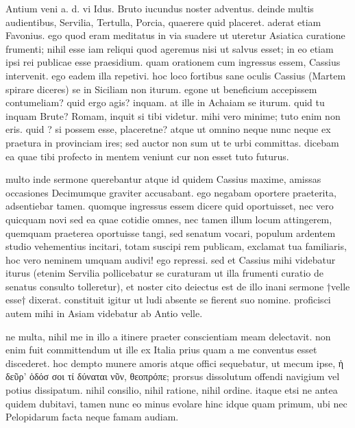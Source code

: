 


 Antium veni a. d. vi Idus. Bruto iucundus noster adventus. deinde multis audientibus, Servilia, Tertulla, Porcia, quaerere quid placeret. aderat etiam Favonius. ego quod eram meditatus in via suadere ut uteretur Asiatica curatione frumenti; nihil esse iam reliqui quod ageremus nisi ut salvus esset; in eo etiam ipsi rei publicae esse praesidium. quam orationem cum ingressus essem, Cassius intervenit. ego eadem illa repetivi. hoc loco fortibus sane oculis Cassius (Martem spirare diceres) se in Siciliam non iturum. egone ut beneficium accepissem contumeliam? quid ergo agis? inquam. at ille in Achaiam se iturum. quid tu inquam Brute? Romam, inquit si tibi videtur. mihi vero minime; tuto enim non eris. quid ? si possem esse, placeretne? atque ut omnino neque nunc neque ex praetura in provinciam ires; sed auctor non sum ut te urbi committas. dicebam ea quae tibi profecto in mentem veniunt cur non esset tuto futurus.

 multo inde sermone querebantur atque id quidem Cassius maxime, amissas occasiones Decimumque graviter accusabant. ego negabam oportere praeterita, adsentiebar tamen. quomque ingressus essem dicere quid oportuisset, nec vero quicquam novi sed ea quae cotidie omnes, nec tamen illum locum attingerem, quemquam praeterea oportuisse tangi, sed senatum vocari, populum ardentem studio vehementius incitari, totam suscipi rem publicam, exclamat tua familiaris, hoc vero neminem umquam audivi! ego repressi. sed et Cassius mihi videbatur iturus (etenim Servilia pollicebatur se curaturam ut illa frumenti curatio de senatus consulto tolleretur), et noster cito deiectus est de illo inani sermone †velle esse† dixerat. constituit igitur ut ludi absente se fierent suo nomine. proficisci autem mihi in Asiam videbatur ab Antio velle.

 ne multa, nihil me in illo a itinere praeter conscientiam meam delectavit. non enim fuit committendum ut ille ex Italia prius quam a me conventus esset discederet. hoc dempto munere amoris atque offici sequebatur, ut mecum ipse, ἡ δεῦρ' ὁδόσ σοι τί δύναται νῦν, θεοπρόπε; prorsus dissolutum offendi navigium vel potius dissipatum. nihil consilio, nihil ratione, nihil ordine. itaque etsi ne antea quidem dubitavi, tamen nunc eo minus evolare hinc idque quam primum, ubi nec Pelopidarum facta neque famam audiam.

